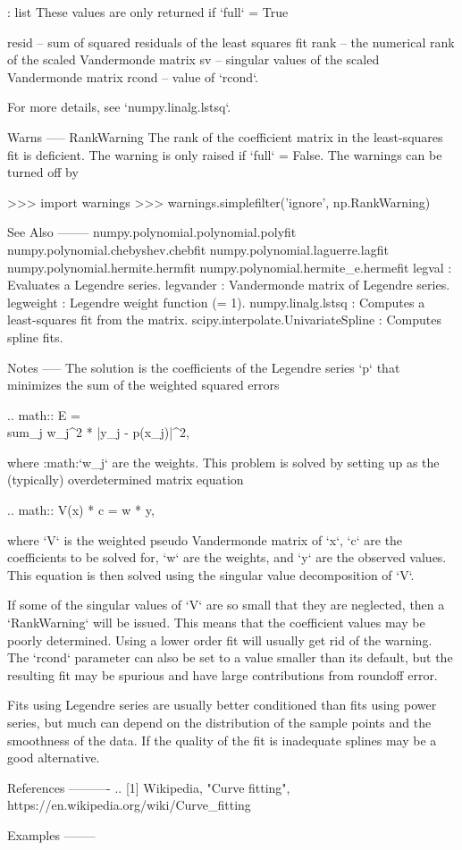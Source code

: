 \begin{DoxyVerb}
 : list
    These values are only returned if `full` = True

    resid -- sum of squared residuals of the least squares fit
    rank -- the numerical rank of the scaled Vandermonde matrix
    sv -- singular values of the scaled Vandermonde matrix
    rcond -- value of `rcond`.

    For more details, see `numpy.linalg.lstsq`.

Warns
-----
RankWarning
    The rank of the coefficient matrix in the least-squares fit is
    deficient. The warning is only raised if `full` = False.  The
    warnings can be turned off by

    >>> import warnings
    >>> warnings.simplefilter('ignore', np.RankWarning)

See Also
--------
numpy.polynomial.polynomial.polyfit
numpy.polynomial.chebyshev.chebfit
numpy.polynomial.laguerre.lagfit
numpy.polynomial.hermite.hermfit
numpy.polynomial.hermite_e.hermefit
legval : Evaluates a Legendre series.
legvander : Vandermonde matrix of Legendre series.
legweight : Legendre weight function (= 1).
numpy.linalg.lstsq : Computes a least-squares fit from the matrix.
scipy.interpolate.UnivariateSpline : Computes spline fits.

Notes
-----
The solution is the coefficients of the Legendre series `p` that
minimizes the sum of the weighted squared errors

.. math:: E = \\sum_j w_j^2 * |y_j - p(x_j)|^2,

where :math:`w_j` are the weights. This problem is solved by setting up
as the (typically) overdetermined matrix equation

.. math:: V(x) * c = w * y,

where `V` is the weighted pseudo Vandermonde matrix of `x`, `c` are the
coefficients to be solved for, `w` are the weights, and `y` are the
observed values.  This equation is then solved using the singular value
decomposition of `V`.

If some of the singular values of `V` are so small that they are
neglected, then a `RankWarning` will be issued. This means that the
coefficient values may be poorly determined. Using a lower order fit
will usually get rid of the warning.  The `rcond` parameter can also be
set to a value smaller than its default, but the resulting fit may be
spurious and have large contributions from roundoff error.

Fits using Legendre series are usually better conditioned than fits
using power series, but much can depend on the distribution of the
sample points and the smoothness of the data. If the quality of the fit
is inadequate splines may be a good alternative.

References
----------
.. [1] Wikipedia, "Curve fitting",
       https://en.wikipedia.org/wiki/Curve_fitting

Examples
--------\end{DoxyVerb}
